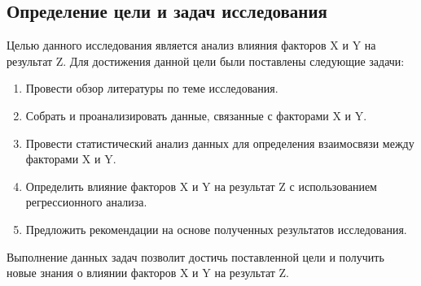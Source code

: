 \documentclass{article}
\begin{document}
\subsection{Определение цели и задач исследования}
Целью данного исследования является анализ влияния факторов X и Y на результат Z. Для достижения данной цели были поставлены следующие задачи:
\begin{enumerate}
\item Провести обзор литературы по теме исследования.
\item Собрать и проанализировать данные, связанные с факторами X и Y.
\item Провести статистический анализ данных для определения взаимосвязи между факторами X и Y.
\item Определить влияние факторов X и Y на результат Z с использованием регрессионного анализа.
\item Предложить рекомендации на основе полученных результатов исследования.
\end{enumerate}
Выполнение данных задач позволит достичь поставленной цели и получить новые знания о влиянии факторов X и Y на результат Z.
\end{document}
